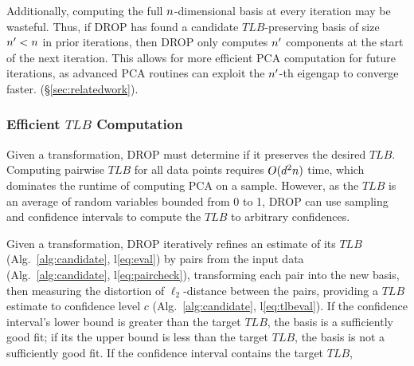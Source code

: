 Additionally, computing the full ${\color{black}n}$-dimensional basis at every iteration may be wasteful. 
Thus, if DROP has found a candidate $TLB$-preserving basis of size ${\color{black}n}' < {\color{black}n}$ in prior iterations, then DROP only computes ${\color{black}n}'$ components at the start of the next iteration.
This allows for more efficient PCA computation for future iterations, as advanced PCA routines can exploit the ${\color{black}n}'$-th eigengap to converge faster. (\S\ref{sec:relatedwork}).



\subsubsection{Efficient $TLB$ Computation}

Given a transformation, DROP must determine if it preserves the desired $TLB$.
Computing pairwise $TLB$ for all data points requires $O({\color{black}d}^2{\color{black}n})$ time, which dominates the runtime of computing PCA on a sample.
However, as the $TLB$ is an average of random variables bounded from 0 to 1, DROP can use sampling and confidence intervals to compute the $TLB$ to arbitrary confidences.

Given a transformation, DROP iteratively refines an estimate of its $TLB$ (Alg.~\ref{alg:candidate}, l\ref{eq:eval}) by  pairs from the input data (Alg.~\ref{alg:candidate}, l\ref{eq:paircheck}), transforming each pair into the new basis, then measuring the distortion of $\ell_2$-distance between the pairs, providing a $TLB$ estimate to confidence level $c$ (Alg.~\ref{alg:candidate}, l\ref{eq:tlbeval}). 
If the confidence interval's lower bound is greater than the target $TLB$, the basis is a sufficiently good fit; if its the upper bound is less than the target $TLB$, the basis is not a sufficiently good fit. 
If the confidence interval contains the target $TLB$,  

